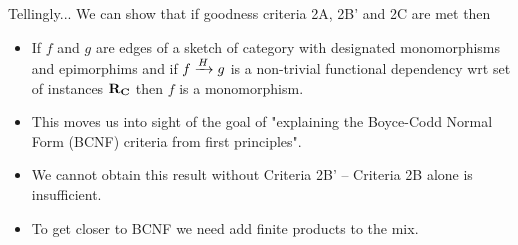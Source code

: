 \begin{frame}{Tellingly...}
We can show that if
 goodness criteria 2A,  2B' and 2C are met then 
\begin{itemize}
\item If $f$ and $g$ are edges of a sketch of category \catcw 
with designated monomorphisms and epimorphims and if $\fundep{H}{f}{g}$ is a non-trivial  functional dependency wrt set of instances $\reqtc$ then $f$ is a monomorphism. 

\item This moves us into sight of the goal of "explaining the Boyce-Codd Normal Form (BCNF) criteria from first principles". 

\item We cannot obtain this result without Criteria 2B' -- Criteria 2B alone is insufficient.

\item To get closer to BCNF we need add finite products to the mix.
\end{itemize}
\end{frame}


